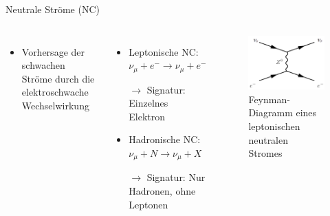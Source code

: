 \documentclass[aspectratio=1610, professionalfonts, 10pt]{beamer}
\begin{document}
\begin{frame}{Neutrale Ströme (NC)}
	\begin{columns}
				\begin{itemize}
					  \setlength\itemsep{0.5em}
					\item Vorhersage der schwachen Ströme durch die elektroschwache Wechselwirkung
				\end{itemize}
				\vspace*{20px}
				\begin{itemize}
					\setlength\itemsep{0.5em}
					\item Leptonische NC: $\nu_\mu + e^- \rightarrow \nu_\mu + e^-$
					\item[$\rightarrow$] Signatur: Einzelnes Elektron
					\item Hadronische NC: $\nu_\mu + N \rightarrow \nu_\mu + X$
					\item[$\rightarrow$] Signatur: Nur Hadronen, ohne Leptonen
				\end{itemize}
			\begin{figure}
	  			\centering
				\includegraphics[width=\linewidth]{Images/Neutral_current,_leptonic_event,_muon_neutrino.png}
	  			\caption{Feynman-Diagramm eines leptonischen neutralen Stromes \cite{wiki:NC}}
	  			\label{fig:feynman}
			\end{figure}
	\end{columns}
\end{frame}
\end{document}
